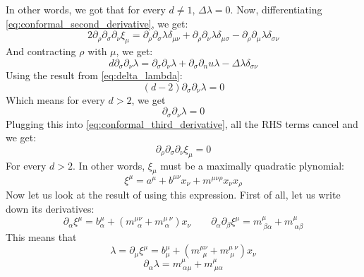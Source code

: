 \documentclass{article}
\begin{document}
In other words, we got that for every $d \ne 1$, $\Delta \lambda = 0$. Now,
differentiating \ref{eq:conformal_second_derivative}, we get:
\begin{equation}
\label{eq:conformal_third_derivative}
    2 \partial_\rho \partial_\sigma\partial_\nu \xi_{\mu} = \partial_\rho \partial_\sigma \lambda \delta_{\mu\nu} + \partial_\rho \partial_\nu \lambda \delta_{\mu\sigma} - \partial_\rho \partial_\mu \lambda \delta_{\sigma\nu}
\end{equation}
And contracting $\rho$ with $\mu$, we get:
\begin{equation}
    d \partial_\sigma \partial_\nu \lambda = \partial_\sigma \partial_\nu \lambda + \partial_\sigma \partial_nu \lambda - \Delta \lambda \delta_{\sigma\nu}
\end{equation}
Using the result from \ref{eq:delta_lambda}:
\begin{equation}
    (d-2)\partial_\sigma \partial_\nu \lambda = 0
\end{equation}
Which means for every $d > 2$, we get
\begin{equation}
    \partial_\sigma \partial_\nu \lambda = 0
\end{equation}
Plugging this into \ref{eq:conformal_third_derivative}, all the RHS terms cancel and we get:
\begin{equation}
    \partial_\rho \partial_\sigma\partial_\nu \xi_{\mu} = 0
\end{equation}
For every $d > 2$. In other words, $\xi_{\mu}$ must be a maximally quadratic plynomial:
\begin{equation}
\label{eq:quad_form}
    \xi^\mu = a^\mu + b^{\mu\nu} x_\nu + m^{\mu\nu\rho}x_\nu x_\rho
\end{equation}
Now let us look at the result of using this expression. First of all, let us write down its derivatives:
\begin{equation}
\label{eq:quad_derivatives}
    \partial_\alpha \xi^\mu = b_{\alpha}^{\mu} + \left(m_{\ \ \alpha}^{\mu\nu} + m_{\ \alpha}^{\mu \ \nu}\right)x_\nu \qquad
    \partial_\alpha \partial_\beta \xi^\mu = m_{\ \beta\alpha}^{\mu} + m_{\ \alpha\beta}^{\mu}
\end{equation}
This means that
\begin{equation}
    \lambda =  \partial_\mu \xi^\mu = b_{\mu}^{\mu} + \left(m_{\ \ \mu}^{\mu\nu} + m_{\ \mu}^{\mu \ \nu}\right)x_\nu
\end{equation}
\begin{equation}
    \partial_\alpha \lambda =  m_{\ \alpha\mu}^{\mu} + m_{\ \mu\alpha}^{\mu}
\end{equation}
\end{document}
